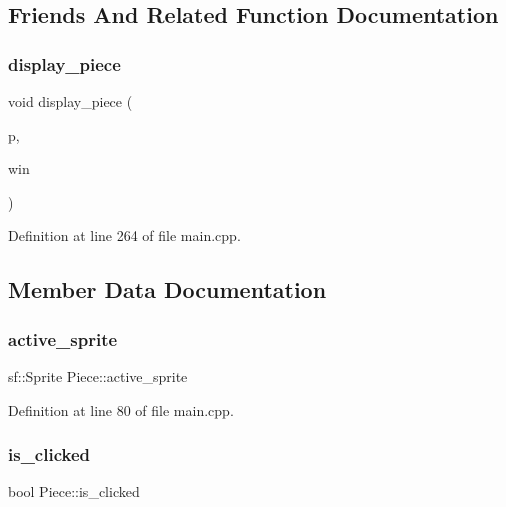 \subsection{Friends And Related Function Documentation}
\mbox{\label{class_piece_ae756348a210f32b7eda542c76a5d666e}} 
\subsubsection{\texorpdfstring{display\_piece}{display\_piece}}
{\footnotesize\ttfamily void display\+\_\+piece (\begin{DoxyParamCaption}\item[{\mbox{\hyperlink{class_piece}{Piece}} $\ast$}]{p,  }\item[{sf\+::\+Render\+Window \&}]{win }\end{DoxyParamCaption})\hspace{0.3cm}{\ttfamily [friend]}}



Definition at line 264 of file main.\+cpp.



\subsection{Member Data Documentation}
\mbox{\label{class_piece_a65fa621a87983d21756c2d2d63e8189b}} 
\subsubsection{\texorpdfstring{active\_sprite}{active\_sprite}}
{\footnotesize\ttfamily sf\+::\+Sprite Piece\+::active\+\_\+sprite}



Definition at line 80 of file main.\+cpp.

\mbox{\label{class_piece_ab2ba8aa3a4471ff1a5400fe0617657cb}} 
\subsubsection{\texorpdfstring{is\_clicked}{is\_clicked}}
{\footnotesize\ttfamily bool Piece\+::is\+\_\+clicked}



